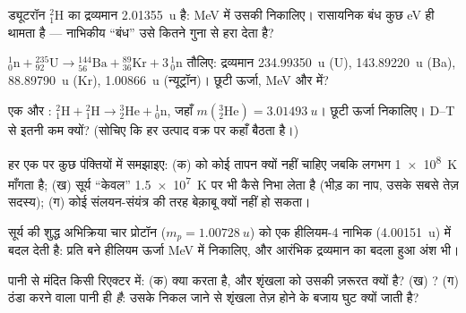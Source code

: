 \begin{exercise}[$\star\star$]\label{exo:g12:nuclear-energy:6}
ड्यूटरॉन ${}^{2}_{1}\mathrm{H}$ का द्रव्यमान \qty{2.01355}{u} है: \unit{MeV} में उसकी 
निकालिए। रासायनिक बंध कुछ \unit{eV} ही थामता है --- नाभिकीय ``बंध'' उसे कितने
गुना से हरा देता है?
\end{exercise}

\begin{exercise}[$\star\star$]\label{exo:g12:nuclear-energy:7}
 ${}^{1}_{0}\mathrm{n} + {}^{235}_{92}\mathrm{U} \to
{}^{144}_{56}\mathrm{Ba} + {}^{89}_{36}\mathrm{Kr} + 3\,{}^{1}_{0}\mathrm{n}$ तौलिए: द्रव्यमान \qty{234.99350}{u} (U), \qty{143.89220}{u} (Ba), \qty{88.89790}{u}
(Kr), \qty{1.00866}{u} (न्यूट्रॉन)। छूटी ऊर्जा, \unit{MeV} और  में?
\end{exercise}

\begin{exercise}[$\star\star$]\label{exo:g12:nuclear-energy:8}
एक और : ${}^{2}_{1}\mathrm{H} + {}^{2}_{1}\mathrm{H} \to
{}^{3}_{2}\mathrm{He} + {}^{1}_{0}\mathrm{n}$, जहाँ $m({}^{3}_{2}\mathrm{He}) = \qty{3.01493}{u}$। छूटी ऊर्जा निकालिए।
D--T से इतनी कम क्यों? (सोचिए कि हर उत्पाद वक्र पर कहाँ बैठता है।)
\end{exercise}

\begin{exercise}[$\star\star$]\label{exo:g12:nuclear-energy:9}
हर एक पर कुछ पंक्तियों में समझाइए: (क)  को कोई तापन क्यों नहीं
चाहिए जबकि  लगभग \qty{1e8}{K} माँगता है; (ख) सूर्य ``केवल'' \qty{1.5e7}{K} पर
भी कैसे निभा लेता है (भीड़ का नाप, उसके सबसे तेज़ सदस्य); (ग) कोई
संलयन-संयंत्र  की तरह बेक़ाबू क्यों नहीं हो
सकता।
\end{exercise}

\begin{exercise}[$\star\star$]\label{exo:g12:nuclear-energy:10}
सूर्य की शुद्ध अभिक्रिया चार प्रोटॉन ($m_p = \qty{1.00728}{u}$) को एक हीलियम-4
नाभिक (\qty{4.00151}{u}) में बदल देती है: प्रति बने हीलियम ऊर्जा
\unit{MeV} में निकालिए, और आरंभिक द्रव्यमान का बदला हुआ अंश भी।
\end{exercise}

\begin{exercise}[$\star\star$]\label{exo:g12:nuclear-energy:11}
पानी से मंदित किसी रिएक्टर में: (क)  क्या करता है, और शृंखला को
उसकी ज़रूरत क्यों है? (ख) ? (ग) ठंडा करने वाला पानी ही
 \emph{है}: उसके निकल जाने से शृंखला तेज़ होने के बजाय घुट क्यों
जाती है?
\end{exercise}

